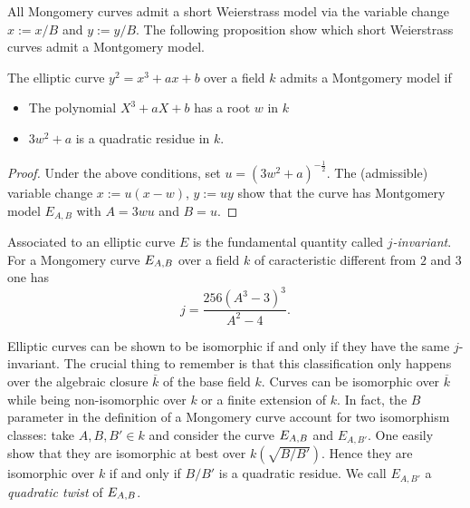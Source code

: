 \documentclass[../main/main.tex]{subfiles}
\begin{document}
All Mongomery curves admit a short Weierstrass model via the variable change $x := x/B$ and $y := y/B$.
The following proposition show which short Weierstrass curves admit a Montgomery model.
\begin{proposition}
	The elliptic curve $y^2 = x^3 + ax + b$ over a field $k$ admits a Montgomery model if
	\begin{itemize}
		\item The polynomial $X^3 + aX + b$ has a root $w$ in $k$
		\item $3w^2 + a$ is a quadratic residue in $k$.
	\end{itemize}
\end{proposition}
\begin{proof}
	Under the above conditions, set $u = (3w^2+a)^{-\frac{1}{2}}$.
	The (admissible) variable change $x:= u(x-w)$, $y:= uy$ show that the curve has Montgomery model $E_{A, B}$ with $A = 3wu$ and $B=u$.
\end{proof}

Associated to an elliptic curve $E$ is the fundamental quantity called $j$\textit{-invariant}.
For a Mongomery curve $E_{A, B}$ over a field $k$ of caracteristic different from $2$ and $3$ one has
\[
	j = \frac{256(A^3-3)^3}{A^2 - 4}.
\]

Elliptic curves can be shown to be isomorphic if and only if they have the same $j$-invariant.
The crucial thing to remember is that this classification only happens over the algebraic closure $\overbar{k}$ of the base field $k$.
Curves can be isomorphic over $\overbar{k}$ while being non-isomorphic over $k$ or a finite extension of $k$.
In fact, the $B$ parameter in the definition of a Mongomery curve account for two isomorphism classes: take $A, B, B'\in k$ and consider the curve $E_{A, B}$ and $E_{A, B'}$.
One easily show that they are isomorphic at best over $k(\sqrt{B/B'})$.
Hence they are isomorphic over $k$ if and only if $B/B'$ is a quadratic residue.
We call $E_{A, B'}$ a \textit{quadratic twist} of $E_{A, B}$.
\end{document}
